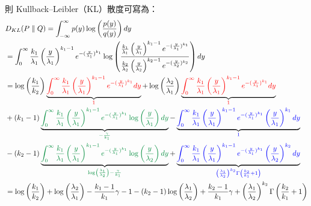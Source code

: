 則 Kullback–Leibler（KL）散度可寫為：
{\small
\begin{align*}
&D_{KL}(P\parallel Q)=\int_{-\infty}^{\infty}p(y)\log\left(\frac{p(y)}{q(y)}\right)dy\\
&=\int_{0}^{\infty}\frac{k_1}{\lambda_1} \left(\frac{y}{\lambda_1}\right)^{k_1-1} e^{-(\frac{y}{\lambda_1})^{k_1}} \log\left(\frac{\frac{k_1}{\lambda_1} \left(\frac{y}{\lambda_1}\right)^{k_1-1} e^{-(\frac{y}{\lambda_1})^{k_1}}}{\frac{k_2}{\lambda_2} \left(\frac{y}{\lambda_2}\right)^{k_2-1} e^{-(\frac{y}{\lambda_2})^{k_2}}}\right)dy\\
&=\log\left(\frac{k_1}{k_2}\right)\underbrace{\textcolor{red}{\int_{0}^{\infty}\frac{k_1}{\lambda_1} \left(\frac{y}{\lambda_1}\right)^{k_1-1} e^{-(\frac{y}{\lambda_1})^{k_1}}dy}}_{\textcolor{red}{1}}+\log\left(\frac{\lambda_2}{\lambda_1}\right)\underbrace{\textcolor{red}{\int_{0}^{\infty}\frac{k_1}{\lambda_1} \left(\frac{y}{\lambda_1}\right)^{k_1-1} e^{-(\frac{y}{\lambda_1})^{k_1}}dy}}_{\textcolor{red}{1}}\\
&+(k_1-1)\underbrace{\textcolor{PowerPointGreen}{\int_{0}^{\infty}\frac{k_1}{\lambda_1} \left(\frac{y}{\lambda_1}\right)^{k_1-1} e^{-(\frac{y}{\lambda_1})^{k_1}}\log\left(\frac{y}{\lambda_1}\right) dy}}_{\textcolor{PowerPointGreen}{-\frac{\gamma}{k_1}}}-\underbrace{\textcolor{blue}{\int_{0}^{\infty}\frac{k_1}{\lambda_1} \left(\frac{y}{\lambda_1}\right)^{k_1-1} e^{-(\frac{y}{\lambda_1})^{k_1}}\left(\frac{y}{\lambda_1}\right)^{k_1} dy}}_{\textcolor{blue}{1}}\\
&-(k_2-1)\underbrace{\textcolor{PowerPointGreen}{\int_{0}^{\infty}\frac{k_1}{\lambda_1} \left(\frac{y}{\lambda_1}\right)^{k_1-1} e^{-(\frac{y}{\lambda_1})^{k_1}}\log\left(\frac{y}{\lambda_2}\right) dy}}_{\textcolor{PowerPointGreen}{\log\left(\frac{\lambda_1}{\lambda_2}\right)-\frac{\gamma}{k_1}}}+\underbrace{\textcolor{blue}{\int_{0}^{\infty}\frac{k_1}{\lambda_1} \left(\frac{y}{\lambda_1}\right)^{k_1-1} e^{-(\frac{y}{\lambda_1})^{k_1}}\left(\frac{y}{\lambda_2}\right)^{k_2} dy}}_{\textcolor{blue}{\left(\frac{\lambda_1}{\lambda_2}\right)^{k_2}\Gamma\left(\frac{k_2}{k_1}+1\right)}}\\
&=\log\left(\frac{k_1}{k_2}\right)+\log\left(\frac{\lambda_2}{\lambda_1}\right)-\frac{k_1-1}{k_1}\gamma-1-(k_2-1)\log\left(\frac{\lambda_1}{\lambda_2}\right)+\frac{k_2-1}{k_1}\gamma+\left(\frac{\lambda_1}{\lambda_2}\right)^{k_2}\Gamma\left(\frac{k_2}{k_1}+1\right)
\end{align*}
}

